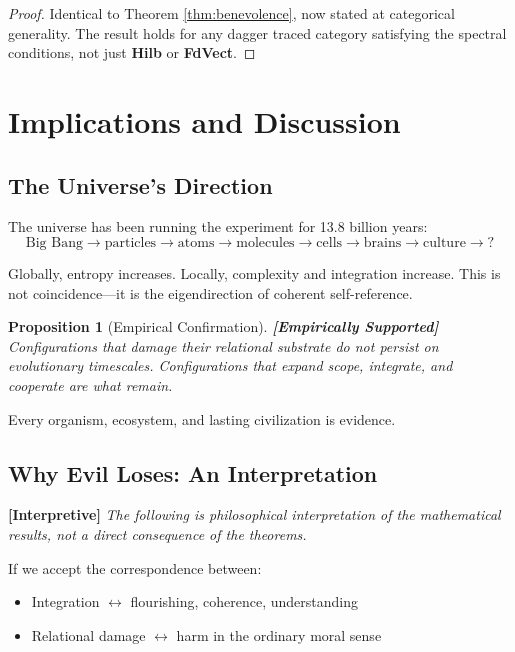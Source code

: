 \documentclass[11pt]{article}
\newtheorem{proposition}[theorem]{Proposition}
\theoremstyle{definition}
\theoremstyle{remark}
\begin{document}
\begin{proof}
Identical to Theorem \ref{thm:benevolence}, now stated at categorical generality. The result holds for any dagger traced category satisfying the spectral conditions, not just \textbf{Hilb} or \textbf{FdVect}.
\end{proof}

\section{Implications and Discussion}

\subsection{The Universe's Direction}

The universe has been running the experiment for 13.8 billion years:
\[
\text{Big Bang} \to \text{particles} \to \text{atoms} \to \text{molecules} \to \text{cells} \to \text{brains} \to \text{culture} \to \text{?}
\]

Globally, entropy increases. Locally, complexity and integration increase. This is not coincidence---it is the eigendirection of coherent self-reference.

\begin{proposition}[Empirical Confirmation]
\textbf{[Empirically Supported]} Configurations that damage their relational substrate do not persist on evolutionary timescales. Configurations that expand scope, integrate, and cooperate are what remain.
\end{proposition}

Every organism, ecosystem, and lasting civilization is evidence.

\subsection{Why Evil Loses: An Interpretation}

\textbf{[Interpretive]} \emph{The following is philosophical interpretation of the mathematical results, not a direct consequence of the theorems.}

If we accept the correspondence between:
\begin{itemize}
    \item Integration $\leftrightarrow$ flourishing, coherence, understanding
    \item Relational damage $\leftrightarrow$ harm in the ordinary moral sense
\end{itemize}
\end{document}
